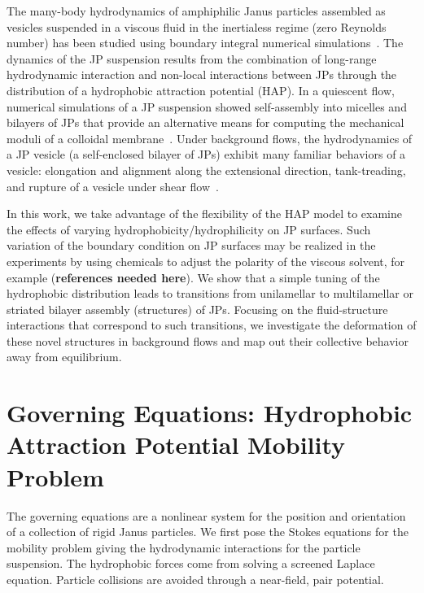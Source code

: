 \documentclass[prb,preprint,showpacs,preprintnumbers,amsmath,amssymb,longbibliography]{revtex4-1}
\begin{document}
The many-body hydrodynamics of amphiphilic Janus particles assembled as
vesicles suspended in a viscous fluid in the inertialess regime (zero Reynolds number) has
been studied using boundary integral numerical
simulations~\cite{Fu20,Fu2022_JFM}. The dynamics of the JP suspension
results from the combination of long-range hydrodynamic interaction and
non-local interactions between JPs through the distribution of a
hydrophobic attraction potential (HAP).
%
In a quiescent flow, numerical simulations of a JP suspension showed
self-assembly into micelles and bilayers of JPs that provide an
alternative means for computing the mechanical moduli of a colloidal
membrane~\cite{NaTr00,Fu20,KrFiGuKaHa13}. Under background flows, the
hydrodynamics of a JP vesicle (a self-enclosed bilayer of JPs) exhibit
many familiar behaviors of a vesicle: elongation and
alignment along the extensional direction, tank-treading, and rupture of
a vesicle under shear flow~\cite{Fu2022_JFM}.

In this work, we take advantage of the flexibility of the HAP model to
examine the effects of varying hydrophobicity/hydrophilicity on JP surfaces.
Such variation of the boundary condition on JP surfaces may be realized in the experiments by using
chemicals to adjust the polarity of the viscous solvent, for example ({\bf references needed here}).
We show that a simple tuning of the hydrophobic distribution leads to transitions from unilamellar to
multilamellar or striated bilayer assembly (structures) of JPs. 
Focusing on the fluid-structure interactions that correspond to such transitions, 
we investigate the deformation of these
novel structures in background flows and map out their collective
behavior away from equilibrium.

\section{Governing Equations: Hydrophobic Attraction Potential Mobility Problem} 
The governing equations are a nonlinear system for the position and
orientation of a collection of rigid Janus particles. We first pose the
Stokes equations for the mobility problem giving the hydrodynamic
interactions for the particle suspension. The hydrophobic forces come
from solving a screened Laplace equation. Particle collisions are
avoided through a near-field, pair potential.

\end{document}
